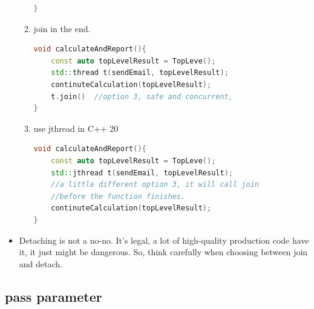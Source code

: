 \documentclass[a4paper,11pt,twoside]{book}
\begin{document}
\begin{itemize}
\begin{enumerate}
\begin{lstlisting}[frame=single, language=c++]
}			
\end{lstlisting}

		\item join in the end.
\begin{lstlisting}[frame=single, language=c++]
void calculateAndReport(){
	const auto topLevelResult = TopLeve();
	std::thread t(sendEmail, topLevelResult);
	continuteCalculation(topLevelResult);
	t.join()  //option 3, safe and concurrent, 
}			
\end{lstlisting}			

		\item use jthread in C++ 20
\begin{lstlisting}[frame=single, language=c++]
void calculateAndReport(){
	const auto topLevelResult = TopLeve();
	std::jthread t(sendEmail, topLevelResult); 
	//a little different option 3, it will call join 
	//before the function finishes.
	continuteCalculation(topLevelResult);
}			
\end{lstlisting}		
	\end{enumerate} 

		\item Detaching is not a no-no. It’s legal, a lot of high-quality production code have it, it just might be dangerous. So, think carefully when choosing between join and detach.
\end{itemize}

\subsection{pass parameter}
\end{document}
